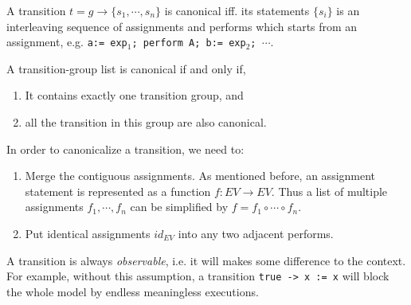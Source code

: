 \begin{definition}
A transition $t=g\rightarrow\{s_1,\cdots,s_n\}$ is canonical iff. its statements $\{s_i\}$ is an interleaving sequence of assignments and performs which starts from an assignment, e.g. \texttt{a:= exp$_1$; perform A; b:= exp$_2$; $\cdots$}.
\end{definition}

\begin{definition}
    A transition-group list is canonical if and only if,
    \begin{enumerate}
        \item It contains exactly one transition group, and
        \item all the transition in this group are also canonical.
    \end{enumerate}
\end{definition}

In order to canonicalize a transition, we need to:
\begin{enumerate}
    \item Merge the contiguous assignments. As mentioned before, an assignment statement is represented as a function $f:EV\rightarrow EV$. Thus a list of multiple assignments $f_1,\cdots, f_n$ can be simplified by $f=f_1\circ\cdots \circ f_n$.
    \item Put identical assignments $id_{EV}$ into any two adjacent performs.
\end{enumerate}

 A transition is always \emph{observable}, i.e. it will makes some difference to the context. For example, without this assumption, a transition \texttt{true -> x := x} will block the whole model by endless meaningless executions.

